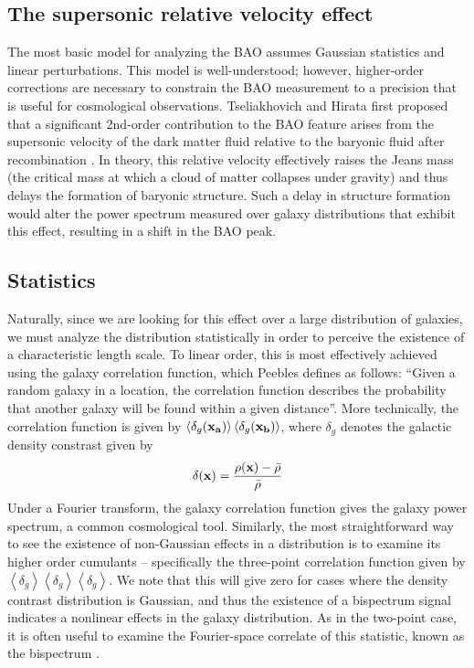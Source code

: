 \documentclass[12pt]{article}
\begin{document}
\subsection{The supersonic relative velocity effect}
The most basic model for analyzing the BAO assumes Gaussian statistics and linear perturbations. This model is well-understood; however, higher-order corrections are necessary to constrain the BAO measurement to a precision that is useful for cosmological observations. Tseliakhovich and Hirata first proposed that a significant 2nd-order contribution to the BAO feature arises from the supersonic velocity of the dark matter fluid relative to the baryonic fluid after recombination \cite{TsHirata}. In theory, this relative velocity effectively raises the Jeans mass (the critical mass at which a cloud of matter collapses under gravity) and thus delays the formation of baryonic structure. Such a delay in structure formation would alter the power spectrum measured over galaxy distributions that exhibit this effect, resulting in a shift in the BAO peak. 

\subsection{Statistics}
Naturally, since we are looking for this effect over a large distribution of galaxies, we must analyze the distribution statistically in order to perceive the existence of a characteristic length scale. To linear order, this is most effectively achieved using the galaxy correlation function, which Peebles defines as follows: ``Given a random galaxy in a location, the correlation function describes the probability that another galaxy will be found within a given distance''\cite{Peebles}. More technically, the correlation function is given by $\left<\delta_{g}({\bf x_{a}})\right>\left<\delta_{g}({\bf x_{b}})\right>$, where $\delta_{g}$ denotes the galactic density constrast given by
\begin{equation}
\delta({\bf x})=\frac{\rho({\bf x})-\bar{\rho}}{\bar{\rho}}
\end{equation}
Under a Fourier transform, the galaxy correlation function gives the galaxy power spectrum, a common cosmological tool. Similarly, the most straightforward way to see the existence of non-Gaussian effects in a distribution is to examine its higher order cumulants -- specifically the three-point correlation function given by $\left<\delta_{g}\right>\left<\delta_{g}\right>\left<\delta_{g}\right>$. We note that this will give zero for cases where the density contrast distribution is Gaussian, and thus the existence of a bispectrum signal indicates a nonlinear effects in the galaxy distribution. As in the two-point case, it is often useful to examine the Fourier-space correlate of this statistic, known as the bispectrum \cite{Bernardeau}.
\end{document}
